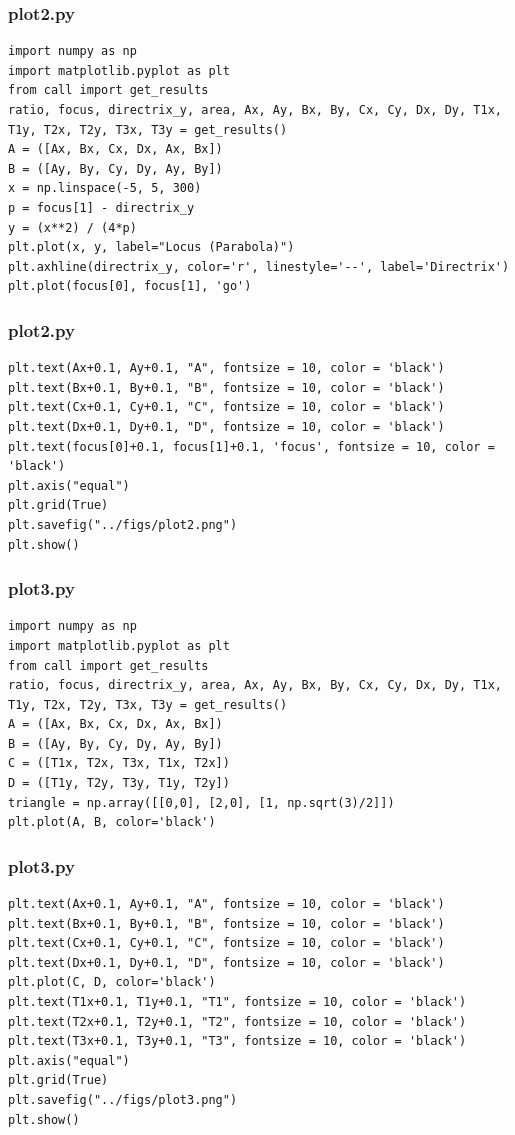 \documentclass{beamer}
\begin{document}
\begin{frame}[fragile]
    \frametitle{plot2.py}
    \begin{lstlisting}
import numpy as np
import matplotlib.pyplot as plt
from call import get_results
ratio, focus, directrix_y, area, Ax, Ay, Bx, By, Cx, Cy, Dx, Dy, T1x, T1y, T2x, T2y, T3x, T3y = get_results()
A = ([Ax, Bx, Cx, Dx, Ax, Bx])
B = ([Ay, By, Cy, Dy, Ay, By])
x = np.linspace(-5, 5, 300)
p = focus[1] - directrix_y
y = (x**2) / (4*p)
plt.plot(x, y, label="Locus (Parabola)")
plt.axhline(directrix_y, color='r', linestyle='--', label='Directrix')
plt.plot(focus[0], focus[1], 'go')
    \end{lstlisting}
\end{frame}

\begin{frame}[fragile]
    \frametitle{plot2.py}
    \begin{lstlisting}
plt.text(Ax+0.1, Ay+0.1, "A", fontsize = 10, color = 'black')
plt.text(Bx+0.1, By+0.1, "B", fontsize = 10, color = 'black')
plt.text(Cx+0.1, Cy+0.1, "C", fontsize = 10, color = 'black')
plt.text(Dx+0.1, Dy+0.1, "D", fontsize = 10, color = 'black')
plt.text(focus[0]+0.1, focus[1]+0.1, 'focus', fontsize = 10, color = 'black')
plt.axis("equal")
plt.grid(True)
plt.savefig("../figs/plot2.png")
plt.show()
    \end{lstlisting}
\end{frame}

\begin{frame}[fragile]
    \frametitle{plot3.py}
    \begin{lstlisting}
import numpy as np
import matplotlib.pyplot as plt
from call import get_results
ratio, focus, directrix_y, area, Ax, Ay, Bx, By, Cx, Cy, Dx, Dy, T1x, T1y, T2x, T2y, T3x, T3y = get_results()
A = ([Ax, Bx, Cx, Dx, Ax, Bx])
B = ([Ay, By, Cy, Dy, Ay, By])
C = ([T1x, T2x, T3x, T1x, T2x])
D = ([T1y, T2y, T3y, T1y, T2y])
triangle = np.array([[0,0], [2,0], [1, np.sqrt(3)/2]])
plt.plot(A, B, color='black')
    \end{lstlisting}
\end{frame}

\begin{frame}[fragile]
    \frametitle{plot3.py}
    \begin{lstlisting}
plt.text(Ax+0.1, Ay+0.1, "A", fontsize = 10, color = 'black')
plt.text(Bx+0.1, By+0.1, "B", fontsize = 10, color = 'black')
plt.text(Cx+0.1, Cy+0.1, "C", fontsize = 10, color = 'black')
plt.text(Dx+0.1, Dy+0.1, "D", fontsize = 10, color = 'black')
plt.plot(C, D, color='black') 
plt.text(T1x+0.1, T1y+0.1, "T1", fontsize = 10, color = 'black')
plt.text(T2x+0.1, T2y+0.1, "T2", fontsize = 10, color = 'black')
plt.text(T3x+0.1, T3y+0.1, "T3", fontsize = 10, color = 'black')
plt.axis("equal")
plt.grid(True)
plt.savefig("../figs/plot3.png")
plt.show()
    \end{lstlisting}
\end{frame}
\end{document}
